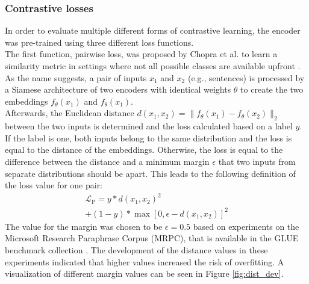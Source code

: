 \documentclass[11pt]{article}
\begin{document}
\subsubsection{Contrastive losses}
In order to evaluate multiple different forms of contrastive learning, the encoder was pre-trained using three different loss functions.\\
The first function, pairwise loss, was proposed by Chopra et al. to learn a similarity metric in settings where not all possible classes are available upfront \cite{chopra:2005}.
As the name suggests, a pair of inputs $x_1$ and $x_2$ (e.g., sentences) is processed by a Siamese architecture of two encoders with identical weights $\theta$ to create the two embeddings $f_\theta(x_1)$ and $f_\theta(x_1)$.\\
Afterwards, the Euclidean distance $d(x_1, x_2)=\| f_\theta(x_1) - f_\theta(x_2) \|_2$ between the two inputs is determined and the loss calculated based on a label $y$.
If the label is one, both inputs belong to the same distribution and the loss is equal to the distance of the embeddings.
Otherwise, the loss is equal to the difference between the distance and a minimum margin $\epsilon$ that two inputs from separate distributions should be apart.
This leads to the following definition of the loss value for one pair:
\begin{equation}\begin{split}
\label{eq:pairLoss}
    \mathcal{L}_\text{P} = y*d(x_1, x_2)^2 \\
        + (1-y)*\max[0, \epsilon - d(x_1, x_2)]^2
\end{split}\end{equation}
The value for the margin was chosen to be $\epsilon=0.5$ based on experiments on the Microsoft Research Paraphrase Corpus (MRPC), that is available in the GLUE benchmark collection \cite{dolan:2005, wang:2018}.  
The development of the distance values in these experiments indicated that higher values increased the risk of overfitting.
A visualization of different margin values can be seen in Figure \ref{fig:dist_dev}.\\
\end{document}
